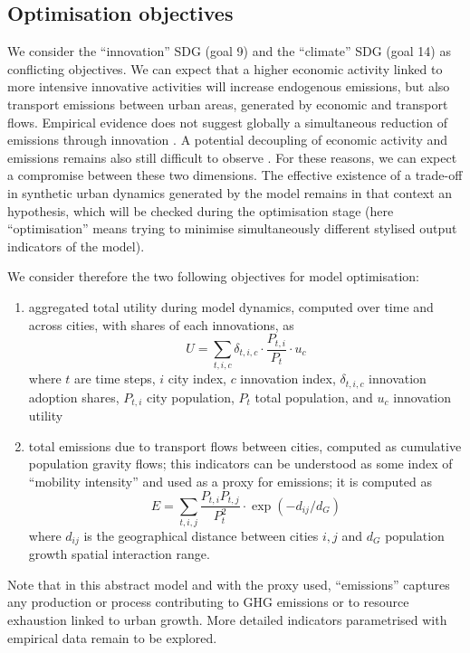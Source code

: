 \documentclass[final,5p,times,twocolumn,authoryear]{elsarticle}
\begin{document}
\subsection{Optimisation objectives}

We consider the ``innovation'' SDG (goal 9) and the ``climate'' SDG (goal 14) as conflicting objectives. We can expect that a higher economic activity linked to more intensive innovative activities will increase endogenous emissions, but also transport emissions between urban areas, generated by economic and transport flows. Empirical evidence does not suggest globally a simultaneous reduction of emissions through innovation \citep{chen2020does}. A potential decoupling of economic activity and emissions remains also still difficult to observe \citep{haberl2020systematic}. For these reasons, we can expect a compromise between these two dimensions. The effective existence of a trade-off in synthetic urban dynamics generated by the model remains in that context an hypothesis, which will be checked during the optimisation stage (here ``optimisation'' means trying to minimise simultaneously different stylised output indicators of the model).

We consider therefore the two following objectives for model optimisation:

\begin{enumerate}
 \item aggregated total utility during model dynamics, computed over time and across cities, with shares of each innovations, as
 \[
 U = \sum_{t,i,c} \delta_{t,i,c} \cdot \frac{P_{t,i}}{P_t} \cdot u_c
 \]
 where $t$ are time steps, $i$ city index, $c$ innovation index, $\delta_{t,i,c}$ innovation adoption shares, $P_{t,i}$ city population, $P_t$ total population, and $u_c$ innovation utility
 \item total emissions due to transport flows between cities, computed as cumulative population gravity flows; this indicators can be understood as some index of ``mobility intensity'' and used as a proxy for emissions; it is computed as
 \[
 E = \sum_{t,i,j} \frac{P_{t,i}P_{t,j}}{P_t^2} \cdot \exp\left(- d_{ij} / d_G\right)
 \]
 where $d_{ij}$ is the geographical distance between cities $i,j$ and $d_G$ population growth spatial interaction range.
\end{enumerate}

Note that in this abstract model and with the proxy used, ``emissions'' captures any production or process contributing to GHG emissions or to resource exhaustion linked to urban growth. More detailed indicators parametrised with empirical data remain to be explored.
\end{document}
